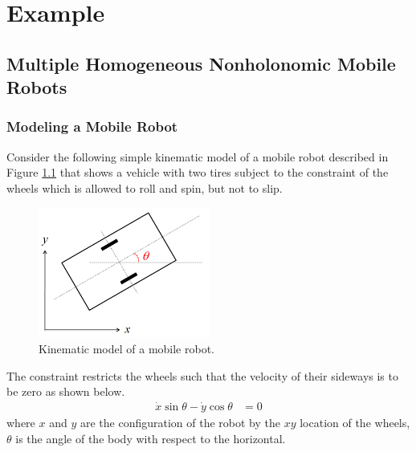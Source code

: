 \documentclass[11pt, a4paper, oneside, openany, reqno]{book}
\theoremstyle{definition}
\theoremstyle{remark}
\numberwithin{equation}{chapter} %
\begin{document}
\chapter{Example}

\section{Multiple Homogeneous Nonholonomic Mobile Robots}

\subsection{Modeling a Mobile Robot}

Consider the following simple kinematic model of a mobile robot described 
in Figure \ref{fig:kinematic_model}
that shows a vehicle with two tires subject to the constraint
of the wheels which is allowed to roll and spin, but not to slip. 

\begin{figure}[htp]
	\centering
	\includegraphics[width=0.50\textwidth]{kinematic_model.png}
	\caption{Kinematic model of a mobile robot.}
	\label{fig:kinematic_model}
\end{figure}

The constraint restricts the wheels 
such that the velocity of their sideways is to be zero as shown below.
\begin{equation}\begin{split}\label{eq:model}
	\dot{x} \sin \theta-\dot{y} \cos \theta &=0
\end{split}\end{equation}
where $ x $ and $ y $ are the configuration of the robot by the $ xy $ location of the wheels,
$ \theta $ is the angle of the body with respect to the horizontal.
\end{document}
